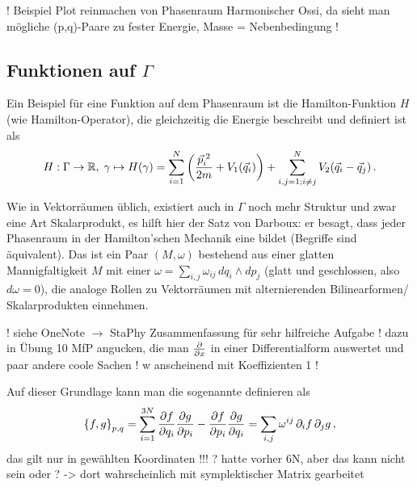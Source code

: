 \documentclass[../KlassMech_main.tex]{subfiles}
\begin{document}
! Beispiel Plot reinmachen von Phasenraum Harmonischer Ossi, da sieht man mögliche (p,q)-Paare zu fester Energie, Masse = Nebenbedingung !



	\subsection{Funktionen auf $\Gamma$}
Ein Beispiel für eine Funktion auf dem Phasenraum ist die Hamilton-Funktion $H$ (wie Hamilton-Operator), die gleichzeitig die Energie beschreibt und definiert ist als
\begin{align}
H: \Gamma \rightarrow \mathbb{R}, \; \gamma \mapsto H(\gamma) = \sum\limits_{i = 1}^N \qty(\frac{\vec{p}^{\;2}_i}{2m} + V_1(\vec{q}_i)) + \sum\limits_{i,j = 1; i \neq j}^N V_2(\vec{q}_i - \vec{q}_j) \, .
\end{align}




Wie in Vektorräumen üblich, existiert auch in $\Gamma$ noch mehr Struktur und zwar eine Art Skalarprodukt, es hilft hier der Satz von Darboux: er besagt, dass jeder Phasenraum in der Hamilton'schen Mechanik eine  bildet (Begriffe sind äquivalent). Das ist ein Paar $(M, \omega)$ bestehend aus einer glatten Mannigfaltigkeit $M$ mit einer  $\omega = \sum\limits_{i,j} \omega_{ij} \, dq_i \wedge dp_j$ (glatt und geschlossen, also $d\omega = 0$), die analoge Rollen zu Vektorräumen mit alternierenden Bilinearformen/ Skalarprodukten einnehmen.

! siehe OneNote $\rightarrow$ StaPhy Zusammenfassung für sehr hilfreiche Aufgabe ! dazu in Übung 10 MfP angucken, die man $\pdv{x}$ in einer Differentialform auswertet und paar andere coole Sachen ! w anscheinend mit Koeffizienten 1 !

Auf dieser Grundlage kann man die sogenannte  definieren als
\begin{equation}
\qty{f,g}_{p,q} = \sum\limits_{i = 1}^{3N} \pdv{f}{q_i} \pdv{g}{p_i} - \pdv{f}{p_i} \pdv{g}{q_i} = \sum\limits_{i,j} \omega^{ij} \, \partial_i f \, \partial_j g \, ,
\end{equation}
das gilt nur in gewählten Koordinaten !!! ? hatte vorher 6N, aber das kann nicht sein oder ? -> dort wahrscheinlich mit symplektischer Matrix gearbeitet
\end{document}
